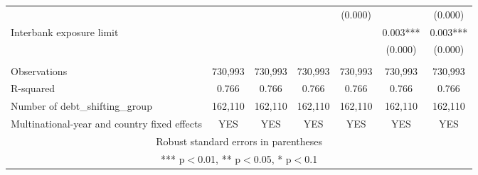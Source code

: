 \begin{tabular}{lcccccc}
 &  &  &  & (0.000) &  & (0.000) \\
Interbank exposure limit &  &  &  &  & 0.003*** & 0.003*** \\
 &  &  &  &  & (0.000) & (0.000) \\
 &  &  &  &  &  &  \\
Observations & 730,993 & 730,993 & 730,993 & 730,993 & 730,993 & 730,993 \\
R-squared & 0.766 & 0.766 & 0.766 & 0.766 & 0.766 & 0.766 \\
Number of debt\_shifting\_group & 162,110 & 162,110 & 162,110 & 162,110 & 162,110 & 162,110 \\
 Multinational-year and country fixed effects & YES & YES & YES & YES & YES & YES \\ \hline
\multicolumn{7}{c}{ Robust standard errors in parentheses} \\
\multicolumn{7}{c}{ *** p$<$0.01, ** p$<$0.05, * p$<$0.1} \\
\end{tabular}
